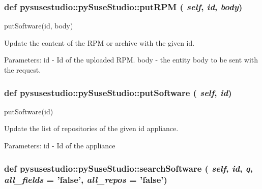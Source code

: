  \hypertarget{classpysusestudio_1_1py_suse_studio_a5d0e4733f7efe9d879110b44848cc4da}{
\subsubsection[{putRPM}]{\setlength{\rightskip}{0pt plus 5cm}def pysusestudio::pySuseStudio::putRPM ( {\em self}, \/   {\em id}, \/   {\em body})}}
\label{classpysusestudio_1_1py_suse_studio_a5d0e4733f7efe9d879110b44848cc4da}
\begin{DoxyVerb}putSoftware(id, body)

        Update the content of the RPM or archive with the given id.  
            
            Parameters:
id - Id of the uploaded RPM. 
body - the entity body to be sent with the request.

\end{DoxyVerb}
 \hypertarget{classpysusestudio_1_1py_suse_studio_ab776945c6d116ac2d2e8acdace99e623}{
\subsubsection[{putSoftware}]{\setlength{\rightskip}{0pt plus 5cm}def pysusestudio::pySuseStudio::putSoftware ( {\em self}, \/   {\em id})}}
\label{classpysusestudio_1_1py_suse_studio_ab776945c6d116ac2d2e8acdace99e623}
\begin{DoxyVerb}putSoftware(id)

        Update the list of repositories of the given id appliance.  
            
            Parameters:
id - Id of the appliance

\end{DoxyVerb}
 \hypertarget{classpysusestudio_1_1py_suse_studio_ad74a578d8eee03662b2a157a98798dbd}{
\subsubsection[{searchSoftware}]{\setlength{\rightskip}{0pt plus 5cm}def pysusestudio::pySuseStudio::searchSoftware ( {\em self}, \/   {\em id}, \/   {\em q}, \/   {\em all\_\-fields} = {\ttfamily 'false'}, \/   {\em all\_\-repos} = {\ttfamily 'false'})}}
